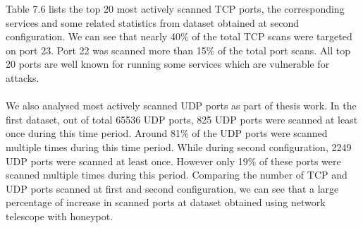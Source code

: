 Table 7.6 lists the top 20 most actively scanned TCP ports, the corresponding services and some related statistics from dataset obtained at second configuration.
We can see that nearly 40\% of the total TCP scans were targeted on port 23.
Port 22 was scanned more than 15\% of the total port scans.
All top 20 ports are well known for running some services which are vulnerable for attacks.\\\\
We also analysed most actively scanned UDP ports as part of thesis work.
In the first dataset, out of total  65536 UDP ports, 825 UDP ports were scanned at least once during this time period.
Around 81\% of the UDP ports were scanned multiple times during this time period.
While during second configuration, 2249 UDP ports were scanned at least once.
However only 19\% of these ports were scanned multiple times during this period.
Comparing the number of TCP and UDP ports scanned at first and second configuration, we can see that a large percentage of increase in scanned ports at dataset obtained using network telescope with honeypot.
\begin{table}[t!]
    \centering
    \caption{Top 10: Most Actively Scanned UDP Ports and their Functions without Honeypot}
\end{table}
